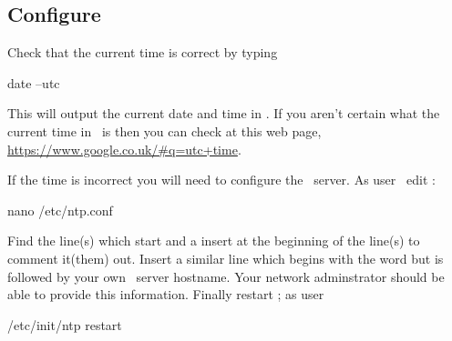 \subsection{Configure \protect{}}
Check that the current time is correct by typing
\begin{Cmd}
date --utc
\end{Cmd}
This will output the current date and time in \utc. If you aren't
certain what the current time in \utc\ is then you can check at this
web page, \url{https://www.google.co.uk/#q=utc+time}.

If the time is incorrect you will need to configure the \ntp\
server. As user \rootUser\ edit :
\begin{Cmd}
nano /etc/ntp.conf
\end{Cmd}

Find the line(s) which start  and a insert
\filename{#} at the beginning of the line(s) to comment it(them)
out. Insert a similar line which begins with the word
 but is followed by your own \ntp\ server
hostname. Your network adminstrator should be able to provide this
information. Finally restart \ntp; as user \rootUser
\begin{Cmd}
/etc/init/ntp restart
\end{Cmd}
